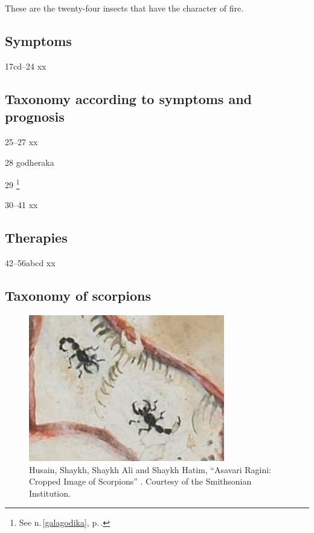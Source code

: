 \begin{translation}
These are the twenty-four insects that have the character of fire.

\subsection{Symptoms}

\item[17cd--24] xx

\subsection{Taxonomy according to symptoms and prognosis}

\item[25--27] xx

\item [28]  \gls{godheraka}    \label{godheraka}
    
\item [29] \footnote{See n.\,\ref{galagodika}, 
p.\,\pageref{galagodika}.}


\item[30--41] xx

\subsection{Therapies}

\item[42--56abcd] xx
 
\subsection{Taxonomy of scorpions}
 
 \begin{figure}
     \centering
     \includegraphics[width=0.7\linewidth]{"media/Scorpions Smithsonian"}
     \caption{Husain, Shaykh, Shaykh Ali and Shaykh Hatim, “Asavari Ragini: 
     Cropped Image of Scorpions” \citep{husa-1591}. Courtesy of the Smithsonian 
     Institution.}
     \label{fig:scorpions-smithsonian}
 \end{figure}
 

\end{translation}
